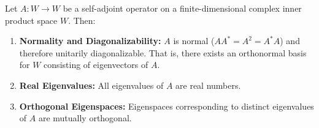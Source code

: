 \begin{theorem}
\label{thm:self_adjoint_props}
Let $A: W \to W$ be a self-adjoint operator on a finite-dimensional complex inner product space $W$. Then:
\begin{enumerate}
    \item \textbf{Normality and Diagonalizability:} $A$ is normal ($AA^* = A^2 = A^*A$) and therefore unitarily diagonalizable. That is, there exists an orthonormal basis for $W$ consisting of eigenvectors of $A$.
    \item \textbf{Real Eigenvalues:} All eigenvalues of $A$ are real numbers.
    \item \textbf{Orthogonal Eigenspaces:} Eigenspaces corresponding to distinct eigenvalues of $A$ are mutually orthogonal.
\end{enumerate}
\end{theorem}
